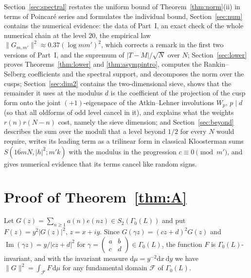 ﻿\documentclass[11pt]{amsart}
\theoremstyle{remark}
\newcommand{\cF}{\mathcal{F}}
\newcommand{\dd}{\mathrm{d}}
\begin{document}
Section~\ref{sec:spectral} restates the uniform bound of Theorem~\ref{thm:norm}(ii) in terms of Poincar\'e series and formulates the individual bound, Section~\ref{sec:num} contains the numerical evidence: the data of Part~I, an exact check of the whole numerical chain at the level $20$, the empirical law $\|G_{m,m'}\|^2\approx0.37(\log mm')^2$, which corrects a remark in the first two versions of Part~I, and the supremum of $|T-M|/\sqrt N$ over $N$; Section~\ref{sec:lower} proves Theorems~\ref{thm:lower} and \ref{thm:asympintro}, computes the Rankin--Selberg coefficients and the spectral support, and decomposes the norm over the cusps; Section~\ref{sec:dim2} contains the two-dimensional sieve, shows that the remainder it uses at the modulus $d$ is the coefficient of the projection of the cusp form onto the joint $(+1)$-eigenspace of the Atkin--Lehner involutions $W_p$, $p\mid d$ (so that all oldforms of odd level cancel in it), and explains what the weights $r(n)r(N-n)$ cost, namely the sieve dimension; and Section~\ref{sec:beyond} describes the sum over the moduli that a level beyond $1/2$ for every $N$ would require, writes its leading term as a trilinear form in classical Kloosterman sums $S(\overline{16m}N,|h|^2;m'k)$ with the modulus in the progression $c\equiv0\pmod{m'}$, and gives numerical evidence that its terms cancel like random signs.

\section{Proof of Theorem~\ref{thm:A}}\label{sec:A}

Let $G(z)=\sum_{n\ge1}a(n)e(nz)\in S_2(\Gamma_0(L))$ and put $F(z)=y^2|G(z)|^2$, $z=x+iy$. Since $G(\gamma z)=(cz+d)^2G(z)$ and $\operatorname{Im}(\gamma z)=y/|cz+d|^2$ for $\gamma=\left(\begin{smallmatrix}a&b\\ c&d\end{smallmatrix}\right)\in\Gamma_0(L)$, the function $F$ is $\Gamma_0(L)$-invariant, and with the invariant measure $\dd\mu=y^{-2}\dd x\,\dd y$ we have $\|G\|^2=\int_{\cF}F\,\dd\mu$ for any fundamental domain $\cF$ of $\Gamma_0(L)$.
\end{document}
